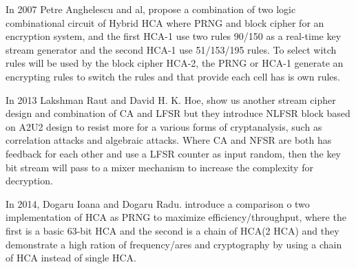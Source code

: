 In 2007 Petre Anghelescu and al, propose a combination of two logic combinational circuit of Hybrid HCA where PRNG and block cipher for an encryption system, and the first HCA-1 use two rules 90/150 as a real-time key stream generator and the second HCA-1 use 51/153/195 rules. To select witch rules will be used by the block cipher HCA-2, the PRNG or HCA-1 generate an encrypting rules to switch the rules and that provide each cell has is own rules. 

In 2013 Lakshman Raut and David H. K. Hoe, show us another stream cipher design and combination of CA and LFSR but they introduce NLFSR block based on A2U2 design to resist more for a various forms of cryptanalysis, such as correlation attacks and algebraic attacks. Where CA and NFSR are both has feedback for each other and use a LFSR counter as input random, then the key bit stream will pass to a mixer mechanism to increase the complexity for decryption. 

In 2014, Dogaru Ioana and Dogaru Radu. introduce a comparison o two implementation of HCA as PRNG to maximize efficiency/throughput, where the first is a basic 63-bit HCA and the second is a chain of HCA(2 HCA) and they demonstrate a high ration of frequency/ares and cryptography by using a chain of HCA instead of single HCA.